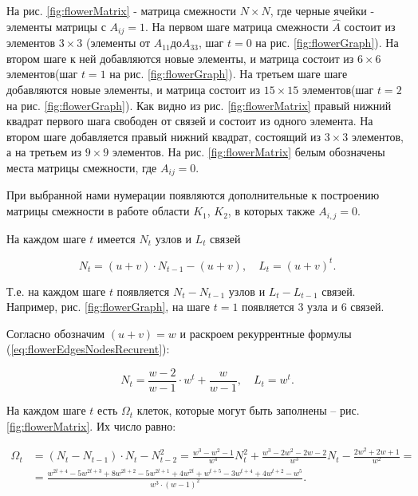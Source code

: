 \documentclass[10pt,aps,pra]{revtex4-1}
\begin{document}
        На рис. \ref{fig:flowerMatrix} - матрица смежности $N \times N$, где черные ячейки - элементы матрицы с $A_{ij}=1$. На первом шаге матрица смежности $\hat{A}$ состоит из элементов $3 \times 3$ (элементы от $A_{11} до A_{33}$, шаг $t=0$ на рис. \ref{fig:flowerGraph}). На втором шаге к ней добавляются новые элементы, и матрица состоит из $6 \times 6$ элементов(шаг $t=1$ на рис. \ref{fig:flowerGraph}). На третьем шаге шаге добавляются новые элементы, и матрица состоит из $15 \times 15$ элементов(шаг $t=2$ на рис. \ref{fig:flowerGraph}). Как видно из рис. \ref{fig:flowerMatrix} правый нижний квадрат первого шага свободен от связей и состоит из одного элемента. На втором шаге добавляется правый нижний квадрат, состоящий из $3 \times 3$ элементов, а на третьем из $9 \times 9$ элементов. На рис. \ref{fig:flowerMatrix} белым обозначены места матрицы смежности, где $A_{ij}=0$.

        При выбранной нами нумерации появляются дополнительные к построению матрицы смежности в работе \cite{Dor1} области $K_1$, $K_2$, в которых также $A_{i,j}=0$. 

        На каждом шаге $t$ имеется $N_t$ узлов и $L_t$ связей \cite{Rozenfeld1}

            \begin{equation}
                \label{eq:flowerEdgesNodesRecurent}
                N_t = (u+v) \cdot N_{t-1}-(u+v), \quad L_t=(u+v)^t.
            \end{equation}

        Т.е. на каждом шаге $t$ появляется $N_t-N_{t-1}$ узлов и $L_t-L_{t-1}$ связей. Например, рис. \ref{fig:flowerGraph}, на шаге $t=1$ появляется 3 узла и 6 связей.

        Согласно \cite{Rozenfeld1} обозначим $(u+v)=w$ и раскроем рекуррентные формулы (\ref{eq:flowerEdgesNodesRecurent}):

            \begin{equation}
                \label{eq:flowerEdgesNodesOpenRecurent}
                N_t = \frac{w-2}{w-1} \cdot w^t+\frac{w}{w-1}, \quad L_t=w^t.
            \end{equation}

        На каждом шаге $t$ есть $\Omega_t$ клеток, которые могут быть заполнены – рис. \ref{fig:flowerMatrix}. Их число равно:

            \begin{equation}
                \label{eq:flowerEmpty}
                \begin{split}
                \Omega_{t} &=(N_t-N_{t-1}) \cdot N_t-N_{t-2}^2 = \frac{w^3-w^2-1}{w^4}N_t^2 + \frac{w^3-2w^2-2w-2}{w^3}N_t-\frac{2w^2+2w+1}{w^2} = \\
                           &= \frac{w^{2t+4}-5w^{2t+3}+8w^{2t+2}-5w^{2t+1}+4w^{2t}+w^{t+5}-3w^{t+4}+4w^{t+2}-w^5}{w^{3} \cdot (w-1)^2}.
                \end{split}
            \end{equation}
\end{document}
